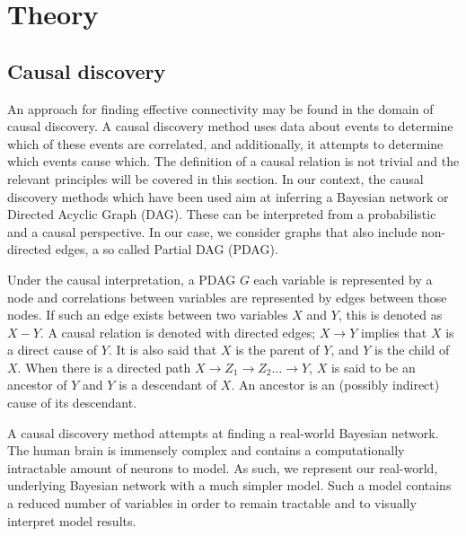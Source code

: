 \documentclass[a4paper, 10pt, english, onecolumn]{article}
\begin{document}
\section{Theory}

\subsection{Causal discovery}
An approach for finding effective connectivity may be found in the domain of causal discovery.
A causal discovery method uses data about events to determine which of these events are correlated, and additionally, it attempts to determine which events cause which.
The definition of a causal relation is not trivial \cite[p.20]{spirtes2000} and the relevant principles will be covered in this section.
In our context, the causal discovery methods which have been used aim at inferring a Bayesian network or Directed Acyclic Graph (DAG).
These can be interpreted from a probabilistic and a causal perspective.
In our case, we consider graphs that also include non-directed edges, a so called Partial DAG (PDAG).

Under the causal interpretation, a PDAG $G$ each variable is represented by a node and correlations between variables are represented by edges between those nodes.
If such an edge exists between two variables $X$ and $Y$, this is denoted as $X - Y$.
A causal relation is denoted with directed edges; $X \rightarrow Y$ implies that $X$ is a direct cause of $Y$.
It is also said that $X$ is the parent of $Y$, and $Y$ is the child of $X$. 
When there is a directed path $X \rightarrow Z_1 \rightarrow Z_2 \dots \rightarrow Y$, $X$ is said to be an ancestor of $Y$ and $Y$ is a descendant of $X$.
An ancestor is an (possibly indirect) cause of its descendant.


A causal discovery method attempts at finding a real-world Bayesian network.
The human brain is immensely complex and contains a computationally intractable amount of neurons to model.
As such, we represent our real-world, underlying Bayesian network with a much simpler model.
Such a model contains a reduced number of variables in order to remain tractable and to visually interpret model results.
\end{document}
